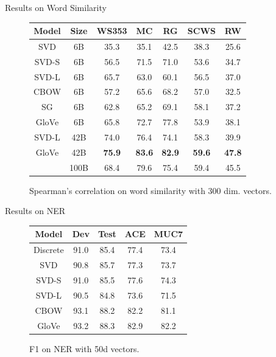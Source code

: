 \begin{frame}{Results on Word Similarity}
  \begin{figure}
    \begin{tabular}{|cc|ccccc|}
      \hline
      Model & Size & WS353 & MC & RG & SCWS & RW\\
      \hline
      SVD & 6B & 35.3 & 35.1 & 42.5 & 38.3 & 25.6 \\
      SVD-S & 6B & 56.5 & 71.5 & 71.0 & 53.6 & 34.7\\
      \alert<2->{SVD-L} & 6B & 65.7 & 63.0 & 60.1 & 56.5 & 37.0\\
      CBOW & 6B & 57.2 & 65.6 & 68.2 & 57.0 & 32.5\\
      SG & 6B & 62.8 & 65.2 & 69.1 & 58.1 & 37.2\\
      GloVe & 6B & 65.8 & 72.7 & 77.8 & 53.9 & 38.1\\
      \hline
      \alert<3->{SVD-L} & 42B & 74.0 & 76.4 & 74.1 & 58.3 & 39.9\\
      GloVe & 42B & {\bf 75.9} & {\bf 83.6} & {\bf 82.9} & {\bf 59.6} & {\bf 47.8}\\
      \hline
      \color<4->{red}{CBOW} & 100B & 68.4 & 79.6 & 75.4 & 59.4 & 45.5\\
      \hline
    \end{tabular}
    \caption{Spearman's correlation on word similarity with 300 dim. vectors.}
  \end{figure}
\end{frame}

\begin{frame}{Results on NER}
  \begin{figure}
    \begin{tabular}{|c|cccc|}
      \hline
      Model & Dev & Test & ACE & MUC7 \\
      \hline
      Discrete & 91.0 & 85.4 & 77.4 & 73.4\\
      SVD & 90.8 & 85.7 & 77.3 & 73.7\\
      SVD-S & 91.0 & 85.5 & 77.6 & 74.3\\
      SVD-L & 90.5 & 84.8 & 73.6 & 71.5\\
      CBOW & 93.1 & 88.2 & 82.2 & 81.1\\
      GloVe & 93.2 & 88.3 & 82.9 & 82.2\\
      \hline
    \end{tabular}
    \caption{F1 on NER with 50d vectors.}
  \end{figure}
\end{frame}


